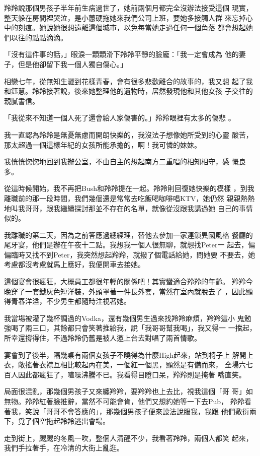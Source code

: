 羚羚說那個男孩子半年前生病過世了，她前兩個月都完全沒辦法接受這個
現實，整天躲在房間裡哭泣，是小蕙硬拖她來我們公司上班，要她多接觸人群
來忘掉心中的刻痕。她說她很想遠離這個城市，以免每當她走過任何一個角落
都會想起她們以往的點點滴滴。

「沒有這件事的話，」眼淚一顆顆滑下羚羚平靜的臉龐：「我一定會成為
他的妻子，但是他卻留下我一個人獨自傷心。」

相戀七年，從無知生澀到花樣青春，會有很多悲歡離合的故事的，我又想
起了我和鈺慧。羚羚接著說，後來她整理他的遺物時，居然發現他和其他女孩
子交往的親膩書信。

「我從來不知道一個人死了還會給人家傷害的。」羚羚眼裡有太多的傷悲
。

我一直認為羚羚是無憂無慮而開朗快樂的，我沒法子想像她所受到的心靈
酸苦，那太超過一個這樣年紀的女孩所能承擔的，啊！我可憐的妹妹。

我恍恍惚惚地回到我辦公室，不由自主的想起南方二重唱的相知相守，感
慨良多。

從這時候開始，我不再把Bush和羚羚提在一起。羚羚則回復她快樂的模樣
，到我離職前的那一段時間，我們幾個還是常常去吃飯喝咖啡唱KTV，她仍然
親親熱熱地叫我哥哥，跟我繼續探討那並不存在的名單，就像從沒跟我講過她
自己的事情似的。

我離職的第二天，因為之前答應過總經理，替他去參加一家連鎖異國風格
餐廳的尾牙宴，他們是辦在午夜十二點。我想我一個人很無聊，就想找Peter一
起去，偏偏臨時又找不到Peter，我突然想起羚羚，就撥了個電話給她，問她要
不要去，她考慮都沒考慮就馬上應好，我便開車去接她。

這個宴會很瘋狂，大概員工都很年輕的關係吧！其實蠻適合羚羚的年齡。
羚羚今晚穿了一套鐵灰色短洋裝，外頭罩著一件長外套，當然在室內就脫去了
，因此顯得青春洋溢，不少男生都隨時注視著她。

我當場被灌了幾杯調過的Vodka，還有幾個男生過來找羚羚麻煩，羚羚這小
鬼勉強喝了兩三口，其餘都只會笑著推給我，說「我哥哥幫我喝」，我又得一
一擋起，所幸還撐得住，不過羚羚仍舊是被人邀上台去對唱了兩首情歌。

宴會到了後半，隔幾桌有兩個女孩子不曉得為什麼High起來，站到椅子上
解開上衣，敞搖著衣襟互相比較起內在美，一個紅一個黑，顯然是有備而來，
全場六七百人因此都瘋狂了，喧噪沸騰不已。我看得目瞪口呆，羚羚則是掩著
嘴直笑。

局面很混亂，那幾個男孩子又來纏羚羚，要羚羚也上去比，視我這個「哥
哥」如無物。羚羚紅著臉推辭，當然不可能會肯，他們又想約她等一下去Pub，
羚羚看著我，笑說「哥哥不會答應的」，那幾個男孩子便來設法說服我，我跟
他們敷衍兩下，覓了個空拖起羚羚逃出會場。

走到街上，颼颼的冬風一吹，整個人清醒不少，我看著羚羚，兩個人都笑
起來，我們手拉著手，在冷清的大街上亂逛。

